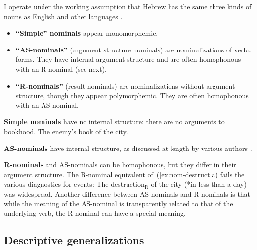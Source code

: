 I operate under the working assumption that Hebrew has the same three kinds of nouns as English and other languages \citep{grimshaw90,alexiadou10b,borer14lingua}.
	\begin{itemize}
	\item \textbf{``Simple'' nominals} appear monomorphemic.
	\item \textbf{``AS-nominals''} (argument structure nominals) are nominalizations of verbal forms. They have internal argument structure and are often homophonous with an R-nominal (see next).
	\item \textbf{``R-nominals''} (result nominals) are nominalizations without argument structure, though they appear polymorphemic. They are often homophonous with an AS-nominal.
	\end{itemize}


\textbf{Simple nominals} have no internal structure: there are no arguments to bookhood.
\ex \ljudge{*} The enemy's book of the city.
\xe	


\textbf{AS-nominals} have internal structure, as discussed at length by various authors \citep{chomsky70,grimshaw90,marantz97,harley09n,alexiadou10b,borer13oup}. 

\textbf{R-nominals} and AS-nominals can be homophonous, but they differ in their argument structure. The R-nominal equivalent of~(\ref{ex:nom-destruct}a) fails the various diagnostics for events:
\ex The destruction$_{\text{R}}$ of the city (*in less than a day) was widespread.
\xe
Another difference between AS-nominals and R-nominals is that while the meaning of the AS-nominal is transparently related to that of the underlying verb, the R-nominal can have a special meaning. 


	\subsection{Descriptive generalizations} \label{passn:n:data}


